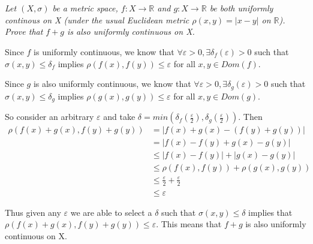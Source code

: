 \documentclass[]{article}
\newcommand{\reals}{\mathbb{R}}
\begin{document}
	\section{}
		\textit{Let $(X, \sigma)$ be a metric space, $f : X \to \reals$ and $g : X \to \reals$ be both uniformly continous on X (under the usual Euclidean metric $\rho(x, y) = |x - y|$ on $\reals$). Prove that $f + g$ is also uniformly continuous on X.}

		Since $f$ is uniformly continuous, we know that $\forall \varepsilon > 0, \exists \delta_f(\varepsilon) > 0$ such that $\sigma(x, y) \leq \delta_f$ implies $\rho(f(x), f(y)) \leq \varepsilon$ for all $x, y \in Dom(f)$. 

		Since $g$ is also uniformly continuous, we know that $\forall \varepsilon > 0, \exists \delta_g(\varepsilon) > 0$ such that $\sigma(x, y) \leq \delta_g$ implies $\rho(g(x), g(y)) \leq \varepsilon$ for all $x, y \in Dom(g)$. 

		So consider an arbitrary $\varepsilon$ and take $\delta = min(\delta_f(\frac{\varepsilon}{2}), \delta_g(\frac{\varepsilon}{2}))$. Then 
		\begin{align*}
			\rho(f(x) + g(x), f(y) + g(y)) &= |f(x) + g(x) - (f(y) + g(y))|& \\
			&= |f(x) - f(y) + g(x) - g(y)| \\
			&\leq |f(x) - f(y)| + |g(x) - g(y)| \\
			&\leq \rho(f(x), f(y)) + \rho(g(x), g(y)) \\
			&\leq \frac{\varepsilon}{2} + \frac{\varepsilon}{2} \\
			&\leq \varepsilon
		\end{align*}

		Thus given any $\varepsilon$ we are able to select a $\delta$ such that $\sigma(x, y) \leq \delta$ implies that $\rho(f(x) + g(x), f(y) + g(y)) \leq \varepsilon$. This means that $f + g$ is also uniformly continuous on X.
\end{document}
